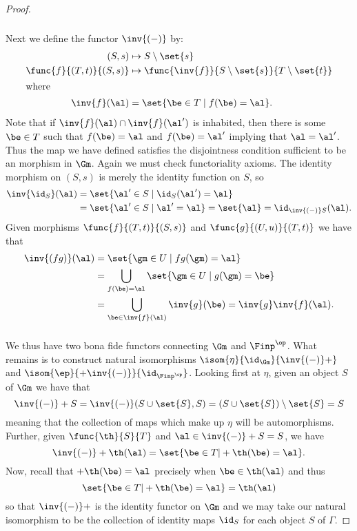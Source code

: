 \documentclass[../../main]{subfiles}
\begin{document}
\begin{proof}
	\subparagraph{}
	Next we define the functor \(\inv{(-)}\) by:
	\begin{align*}
		(S,s)&\mapsto S\setminus\set{s} \\
		\func{f}{(T,t)}{(S,s)}&\mapsto\func{\inv{f}}{S\setminus\set{s}}{T\setminus\set{t}} \\
		\intertext{where}
		\inv{f}(\al)&=\set{\be\in T\mid f(\be)=\al}.
	\end{align*}
	Note that if \(\inv{f}(\al)\cap\inv{f}(\al')\) is inhabited, then there is
	some \(\be\in T\) such that \(f(\be)=\al\) and \(f(\be)=\al'\) implying that
	\(\al=\al'\). Thus the map we have defined satisfies the disjointness
	condition sufficient to be an morphism in \(\Gm\). Again we must check
	functoriality axioms. The identity morphism on \((S,s)\) is merely the
	identity function on \(S\), so
	\begin{align*}
		\inv{\id_S}(\al)
		&=\set{\al'\in S\mid\id_S(\al')=\al} \\
		&=\set{\al'\in S\mid\al'=\al}=\set{\al}=\id_{\inv{(-)}S}(\al).
	\end{align*}
	Given morphisms \(\func{f}{(T,t)}{(S,s)}\) and \(\func{g}{(U,u)}{(T,t)}\) we
	have that
	\begin{align*}
		\inv{(fg)}(\al)&=\set{\gm\in U\mid fg(\gm)=\al} \\
		&=\bigcup_{f(\be)=\al} \set{\gm\in U\mid g(\gm)=\be} \\
		&=\bigcup_{\be\in\inv{f}(\al)}\inv{g}(\be)
		=\inv{g}\inv{f}(\al).
	\end{align*}

	\subparagraph{}
	We thus have two bona fide functors connecting \(\Gm\) and \(\Finp^\op\).
	What remains is to construct natural isomorphisms
	\(\isom{\eta}{\id_\Gm}{\inv{(-)}+}\) and
	\(\isom{\ep}{+\inv{(-)}}{\id_{\Finp^\op}}\). Looking first at \(\eta\),
	given an object \(S\) of \(\Gm\) we have that
	\[\inv{(-)}+S=\inv{(-)}(S\cup\set{S},S)=(S\cup\set{S})\setminus\set{S}=S\]
	meaning that the collection of maps which make up \(\eta\) will be
	automorphisms. Further, given \(\func{\th}{S}{T}\) and
	\(\al\in\inv{(-)}+S=S\), we have
	\[\inv{(-)}+\th(\al)=\set{\be\in T|+\th(\be)=\al}.\] Now, recall that
	\(+\th(\be)=\al\) precisely when \(\be\in\th(\al)\) and thus
	\[\set{\be\in T|+\th(\be)=\al}=\th(\al)\] so that \(\inv{(-)}+\) is the
	identity functor on \(\Gm\) and we may take our natural isomorphism to be
	the collection of identity maps \(\id_S\) for each object \(S\) of
	\(\Gamma\).


\end{proof}
\end{document}
